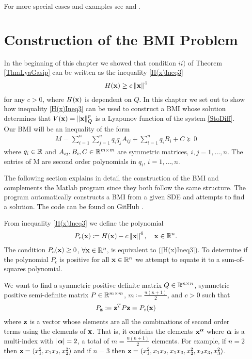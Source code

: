 \documentclass[a4paper,12pt,twoside,BCOR=10mm]{scrbook}
\begin{document}
For more special cases and examples see \citep{HGGS2018localLya} and \citep{sdestab2012khaminskii}.

\section{Construction of the BMI Problem}\label{SectionConstrBMIProblem}
In the beginning of this chapter we showed that condition $ii)$ of Theorem \ref{ThmLyaGasip} can be written as the inequality \eqref{H(x)Ineq3}
\begin{align*}
    H(\mathbf{x}) \geq c\left\lVert\mathbf{x}\right\rVert^4
\end{align*}
for any $c > 0$, where $H(\mathbf{x})$ is dependent on $Q$.
In this chapter we set out to show how inequality \eqref{H(x)Ineq3} can be used to construct a BMI whose solution determines that $V(\mathbf{x}) = \left\lVert\mathbf{x}\right\rVert_Q^p$ is a Lyapunov function of the system \eqref{StoDiff}. Our BMI will be an inequality of the form
\begin{align*}
    M = \sum_{i = 1}^n \sum_{j = 1}^n q_iq_j A_{ij} + \sum_{i = 1}^n q_i B_i + C \succeq 0
\end{align*}
where $q_i \in \mathbb{R}^{}$ and $A_{ij}, B_i, C \in \mathbb{R}^{m \times m}$ are symmetric matrices, $i,j = 1, \ldots, n$. The entries of M are second order polynomials in $q_i$, $i = 1, \ldots, n$.

The following section explains in detail the construction of the BMI and complements the Matlab program since they both follow the same structure. The program automatically constructs a BMI from a given SDE and attempts to find a solution. The code can be found on GitHub \citep{Mverk2022}.

From inequality \eqref{H(x)Ineq3} we define the polynomial
\begin{align}\label{P_c definition}
    P_c(\mathbf{x}) \coloneqq H(\mathbf{x}) - c\left\lVert\mathbf{x}\right\rVert_{}^{4}, \quad \mathbf{x}\in \mathbb{R}^{n}.
\end{align}
The condition $P_c(\mathbf{x}) \geq 0$, $\forall \mathbf{x} \in \mathbb{R}^{n}$, is equivalent to (\ref{H(x)Ineq3}). To determine if the polynomial $P_c$ is positive for all $\mathbf{x} \in \mathbb{R}^{n}$ we attempt to equate it to a sum-of-squares polynomial.

We want to find a symmetric positive definite matrix $Q\in \mathbb{R}^{n\times n}$, symmetric positive semi-definite matrix $P \in \mathbb{R}^{m \times m}$, $m \coloneqq \frac{n(n + 1)}{2}$, and $c > 0$ such that
\begin{align}\label{P_Z definition}
    P_{\mathbf{z}} \coloneqq \mathbf{z}^T P \mathbf{z} = P_c(\mathbf{x})
\end{align}
where $\mathbf{z}$ is a vector whose elements are all the combinations of second order terms using the elements of $\mathbf{x}$. That is, it contains the elements $\mathbf{x}^{\bm{\alpha}}$ where $\bm{\alpha}$ is a multi-index with $|\bm{\alpha}| = 2$, a total of $m = \frac{n(n + 1)}{2}$ elements. For example, if $n = 2$ then $\mathbf{z} = (x_1^2, x_1x_2, x_2^2)$ and if $n = 3$ then $\mathbf{z} = (x_1^2, x_1x_2, x_1x_3, x_2^2, x_2x_3, x_3^2)$.
\end{document}
